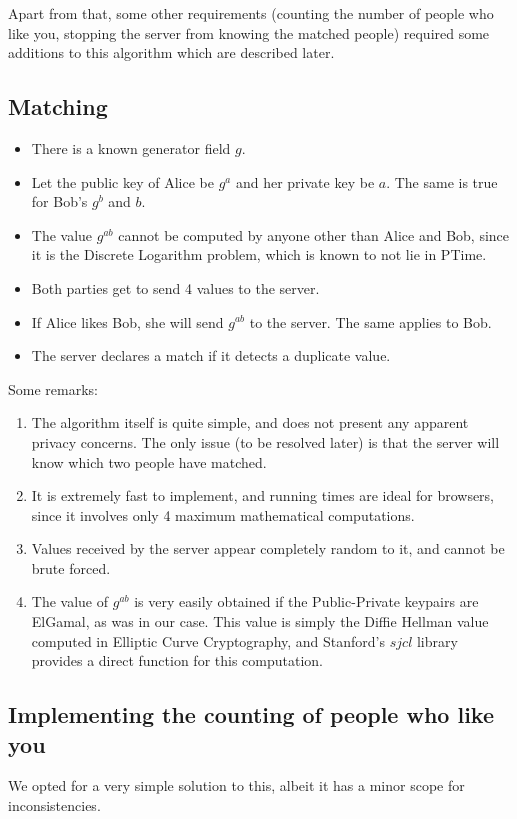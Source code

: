 \documentclass[sigtbd]{sigtbd-style}
\begin{document}
Apart from that, some other requirements (counting the number of
people who like you, stopping the server from knowing the matched
people) required some additions to this algorithm which are described
later.

\subsection{Matching}
\begin{itemize}
\item There is a known generator field $g$.
\item Let the public key of Alice be $g^a$ and her private key be
  $a$. The same is true for Bob's $g^b$ and $b$.
\item The value $g^{ab}$ cannot be computed by anyone other than Alice
  and Bob, since it is the Discrete Logarithm problem, which is known
  to not lie in PTime.
\item Both parties get to send 4 values to the server.
\item If Alice likes Bob, she will send $g^{ab}$ to
  the server. The same applies to Bob.
\item The server declares a match if it detects a duplicate value.
\end{itemize}

Some remarks:
\begin{enumerate}
\item The algorithm itself is quite simple, and does not present any
  apparent privacy concerns. The only issue (to be resolved later) is
  that the server will know which two people have matched.
\item It is extremely fast to implement, and running times are ideal
  for browsers, since it involves only 4 maximum mathematical
  computations.
\item Values received by the server appear completely random to it,
  and cannot be brute forced.
\item The value of $g^{ab}$ is very easily obtained if the
  Public-Private keypairs are ElGamal, as was in our case. This value
  is simply the Diffie Hellman value computed in Elliptic Curve
  Cryptography, and Stanford's $sjcl$ library provides a direct
  function for this computation.
\end{enumerate}

\subsection{Implementing the counting of people who like you}
We opted for a very simple solution to this, albeit it has a minor scope
for inconsistencies.
\end{document}
